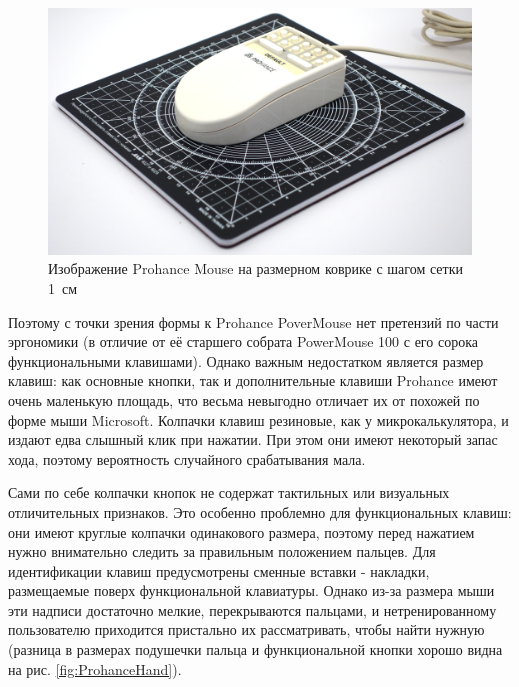 \documentclass[11pt, a4paper]{article}
\begin{document}
\begin{figure}[h]
    \centering
    \includegraphics[scale=0.4]{1989_prohance_powermouse/size_30.jpg}
    \caption{Изображение Prohance Mouse на размерном коврике с шагом сетки 1~см}
    \label{fig:ProhanceSize}
\end{figure}

Поэтому с точки зрения формы к Prohance PoverMouse нет претензий по части эргономики (в отличие от её старшего собрата PowerMouse 100 с его сорока функциональными клавишами). Однако важным недостатком является размер клавиш: как основные кнопки, так и дополнительные клавиши Prohance имеют очень маленькую площадь, что весьма невыгодно отличает их от похожей по форме мыши Microsoft. Колпачки клавиш резиновые, как у микрокалькулятора, и издают едва слышный клик при нажатии. При этом они имеют некоторый запас хода, поэтому вероятность случайного срабатывания мала.

Сами по себе колпачки кнопок не содержат тактильных или визуальных отличительных признаков. Это особенно проблемно для функциональных клавиш: они имеют круглые колпачки одинакового размера, поэтому перед нажатием нужно внимательно следить за правильным положением пальцев. Для идентификации клавиш предусмотрены сменные вставки - накладки, размещаемые поверх функциональной клавиатуры. Однако из-за размера мыши эти надписи достаточно мелкие, перекрываются пальцами, и нетренированному пользователю приходится пристально их рассматривать, чтобы найти нужную (разница в размерах подушечки пальца и функциональной кнопки хорошо видна на рис. \ref{fig:ProhanceHand}).
\end{document}
